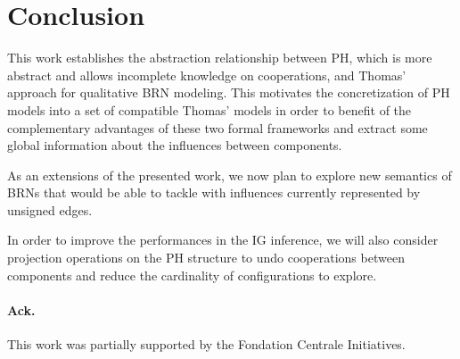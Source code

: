 \section{Conclusion}

This work establishes the abstraction relationship between PH, which is more abstract and allows incomplete knowledge on cooperations, and Thomas' approach for qualitative BRN modeling.
This motivates the concretization of PH models into a set of compatible Thomas' models in order to benefit of the complementary advantages of these two formal frameworks and extract some global information about the influences between components.

As an extensions of the presented work, we now plan to explore new semantics of BRNs that would be able to tackle with influences currently represented by unsigned edges.

In order to improve the performances in the IG inference, we will also consider projection operations on
the PH structure to undo cooperations between components and reduce the cardinality of
configurations to explore.

\paragraph{Ack.}
This work was partially supported by the Fondation Centrale Initiatives.
